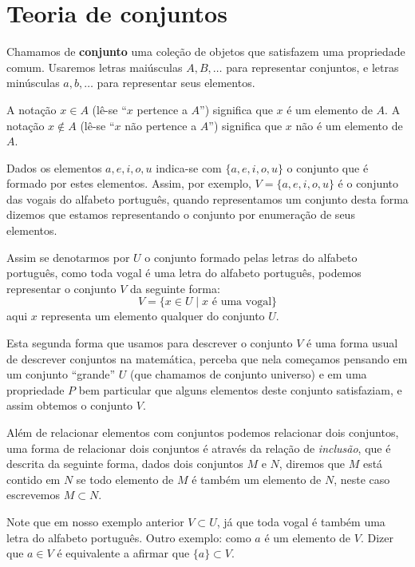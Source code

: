 \chapter{Teoria de conjuntos}


Chamamos de \textbf{conjunto} uma coleção de objetos que satisfazem uma propriedade comum. Usaremos letras maiúsculas $A, B, \ldots$ para representar  conjuntos, e letras minúsculas $a, b, \ldots$ para representar seus elementos.

A notação $x \in A$ (lê-se ``$x$ pertence a $A$'') significa que $x$ é um elemento de $A$. A notação $x \notin A$ (lê-se ``$x$ não pertence a $A$'') significa que $x$ não é um elemento de $A$.

Dados os elementos $a, e, i, o, u$ indica-se com $\{a, e, i, o, u\}$ o conjunto que é formado por estes elementos. Assim, por exemplo, $V= \{a, e, i, o, u\}$ é o conjunto das vogais do alfabeto português, quando representamos um conjunto desta forma dizemos que estamos representando o conjunto por enumeração de seus elementos.

Assim se denotarmos por $U$ o conjunto formado pelas letras do alfabeto português, como toda vogal é uma letra do alfabeto português, podemos representar o conjunto $V$ da seguinte forma:
\[V= \{x \in U \mid x \text{ é uma vogal}\}\]
aqui $x$ representa um elemento qualquer do conjunto $U$.

Esta segunda forma que usamos para descrever o conjunto $V$ é uma forma usual de descrever conjuntos na matemática, perceba que nela começamos pensando em um conjunto ``grande'' $U$ (que chamamos de conjunto universo) e em uma propriedade $P$ bem particular que alguns elementos deste conjunto satisfaziam, e assim obtemos o conjunto $V$.

Além de relacionar elementos com conjuntos podemos relacionar dois conjuntos, uma forma de relacionar dois conjuntos é através da relação de \textit{inclusão}, que é descrita da seguinte forma, dados dois conjuntos $M$ e $N$, diremos que $M$ está contido em $N$ se todo elemento de $M$ é também um elemento de $N$, neste caso escrevemos $M \subset N$.

Note que em nosso exemplo anterior $V \subset U$, já que toda vogal é também uma letra do alfabeto português. Outro exemplo: como $a$ é um elemento de $V$. Dizer que $a \in V$ é equivalente a afirmar que $\{a\} \subset V$.

\vskip0.4cm

